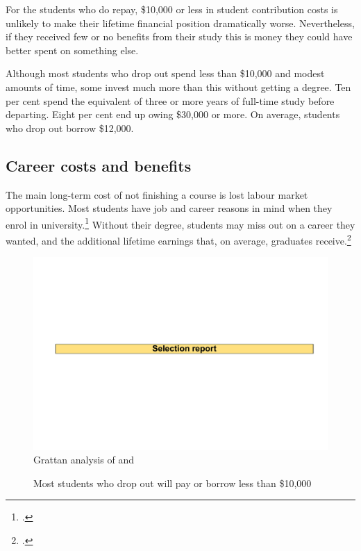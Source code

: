 For the students who do repay, \$10,000 or less in student contribution costs is unlikely to make their lifetime financial position dramatically worse. Nevertheless, if they received few or no benefits from their study this is money they could have better spent on something else.

Although most students who drop out spend less than \$10,000 and modest amounts of time, some invest much more than this without getting a degree. Ten per cent spend the equivalent of three or more years of full-time study before departing. Eight per cent end up owing \$30,000 or more. On average, students who drop out borrow \$12,000.

\subsection{Career costs and benefits }\label{sec:2.1.2}

The main long-term cost of not finishing a course is lost labour market opportunities. Most students have job and career reasons in mind when they enrol in university.\footcites[][24]{Baik2015}[][chapter~5]{Long2006} 
Without their degree, students may miss out on a career they wanted, and the additional lifetime earnings that, on average, graduates receive.\footcites[][]{Norton2012}[][]{Borland2000}[][]{Wei2010}[][]{Daly2012}

                \begin{figure}
                    \caption{Most students who drop out will pay or borrow less than \$10,000\label{fig:8}}%
                    \includegraphics[page=11]{atlas/selection_chartdeck.pdf} 
                    {Grattan analysis of \textcite{DepartmentofEducationandTraining2017g} and \textcite{DepartmentofEducationandTraininga}}
                \end{figure}


